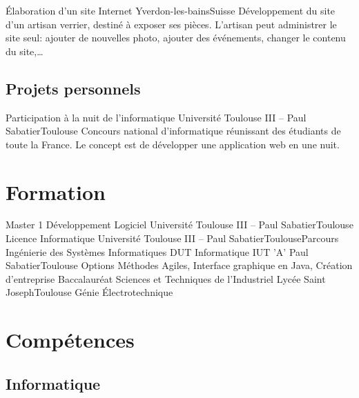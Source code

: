 \documentclass{my_cv_bis}
\begin{document}
	{Élaboration d’un site Internet}
	{Yverdon-les-bains}{Suisse}
	{Développement du site d’un artisan verrier, destiné à exposer ses pièces. L'artisan peut administrer le site
	seul: ajouter de nouvelles photo, ajouter des événements, changer le contenu du site,\ldots}
	{}

	\subsection{Projets personnels}
	{Participation à la nuit de l'informatique}
	{Université Toulouse III -- Paul Sabatier}{Toulouse}
	{ Concours national d’informatique réunissant des étudiants de toute la France. Le concept est de développer une application web en une nuit.} 
	{}
	\vspace{-20px}
\section{Formation}
	{Master 1 Développement Logiciel}
	{Université Toulouse III -- Paul Sabatier}{Toulouse}{}{}
	{Licence Informatique}
	{Université Toulouse III -- Paul Sabatier}{Toulouse}{Parcours Ingénierie des Systèmes Informatiques}{}
	{DUT Informatique}
	{IUT 'A' Paul Sabatier}{Toulouse}
	{Options Méthodes Agiles, Interface graphique en Java, Création d'entreprise}
	{}
	{Baccalauréat Sciences et Techniques de l'Industriel}
	{Lycée Saint Joseph}{Toulouse}
	{Génie Électrotechnique}{}
	\vspace{-20px}
\section{Compétences}
		\subsection{Informatique}
		\\
		\\
		\\
		\\
		\\
\end{document}
